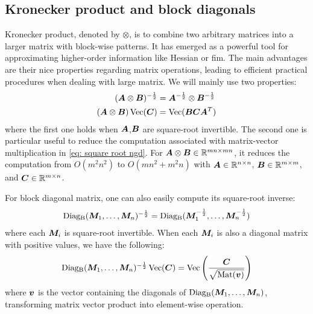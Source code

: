 \subsection{Kronecker product and block diagonals}
\label{subapp: kronecker product and block diagonals}
Kronecker product, denoted by $\otimes$, is to combine two arbitrary matrices into a larger matrix with block-wise patterns. It has emerged as a powerful tool for approximating higher-order information like Hessian \citep{grosse2016kronecker} or \gls{fim}. 
The main advantages are their nice properties regarding matrix operations, leading to efficient practical procedures when dealing with large matrix. We will mainly use two properties:
\begin{align}
    ({\bm{A}}\otimes {\bm{B}})^{-\frac{1}{2}} &= {\bm{A}}^{-\frac{1}{2}}\otimes {\bm{B}}^{-\frac{1}{2}} \label{eq: Kronecker product root inverse}\\
    ({\bm{A}}\otimes {\bm{B}})\operatorname{Vec}({\bm{C}}) &= \operatorname{Vec}({\bm{B}}{\bm{C}}{\bm{A}}^T)\label{eq: Kronecker product vector matrix conversion}
\end{align}
where the first one holds when ${\bm{A}}$,${\bm{B}}$ are square-root invertible. The second one is particular useful to reduce the computation associated with matrix-vector multiplication in \cref{eq: square root ngd}. For ${\bm{A}}\otimes{\bm{B}} \in \mathbb{R}^{mn\times mn}$, it reduces the computation from $O(m^2n^2)$ to $O(mn^2+m^2n)$ with ${\bm{A}}\in\mathbb{R}^{n\times n}$, ${\bm{B}}\in\mathbb{R}^{m\times m}$, and ${\bm{C}}\in\mathbb{R}^{m\times n}$. 

For block diagonal matrix, one can also easily compute its square-root inverse:
\begin{align}
    \operatorname{Diag_B}({\bm{M}}_1,\ldots,{\bm{M}}_n)^{-\frac{1}{2}} = \operatorname{Diag_B}({\bm{M}}_1^{-\frac{1}{2}},\ldots,{\bm{M}}_n^{-\frac{1}{2}})
    \label{eq: block diagonal square root inverse}
\end{align}
where each ${\bm{M}}_i$ is square-root invertible. When each ${\bm{M}}_i$ is also a diagonal matrix with positive values, we have the following:
\begin{equation}
    \operatorname{Diag_B}({\bm{M}}_1,\ldots,{\bm{M}}_n)^{-\frac{1}{2}}\operatorname{Vec}({\bm{C}}) = \operatorname{Vec}\left(\frac{{\bm{C}}}{\sqrt{\operatorname{Mat}({\bm{v}})}}\right)
    \label{eq: block diagonal elementwise division}
\end{equation}
where ${\bm{v}}$ is the vector containing the diagonals of $\operatorname{Diag_B}({\bm{M}}_1,\ldots,{\bm{M}}_n)$, transforming matrix vector product into element-wise operation.  

